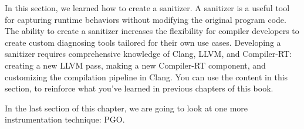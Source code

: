 
In this section, we learned how to create a sanitizer. A sanitizer is a useful tool for
capturing runtime behaviors without modifying the original program code. The ability
to create a sanitizer increases the flexibility for compiler developers to create custom
diagnosing tools tailored for their own use cases. Developing a sanitizer requires
comprehensive knowledge of Clang, LLVM, and Compiler-RT: creating a new LLVM
pass, making a new Compiler-RT component, and customizing the compilation pipeline
in Clang. You can use the content in this section, to reinforce what you've learned in
previous chapters of this book.

In the last section of this chapter, we are going to look at one more instrumentation technique: PGO.















